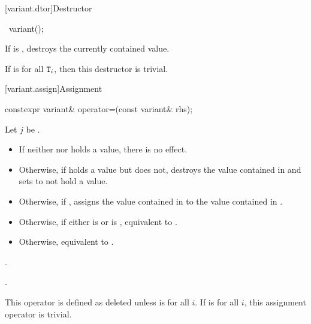 [variant.dtor]{Destructor}

%
\begin{itemdecl}
~variant();
\end{itemdecl}

\begin{itemdescr}
\pnum
\effects
If  is ,
destroys the currently contained value.

\pnum
\remarks
If  is  for all $\texttt{T}_i$,
then this destructor is trivial.
\end{itemdescr}

[variant.assign]{Assignment}

%
\begin{itemdecl}
constexpr variant& operator=(const variant& rhs);
\end{itemdecl}

\begin{itemdescr}
\pnum
Let $j$ be .

\pnum
\effects
\begin{itemize}
\item
If neither  nor  holds a value, there is no effect.
\item
Otherwise, if  holds a value but  does not, destroys the value
contained in  and sets  to not hold a value.
\item
Otherwise, if , assigns the value contained in 
to the value contained in .
\item
Otherwise, if either 
is  or
 is ,
equivalent to .
\item
Otherwise, equivalent to .
\end{itemize}

\pnum
\returns
{}.

\pnum
\ensures
{}.

\pnum
\remarks
This operator is defined as deleted unless
is  for all $i$.
If 
is  for all $i$, this assignment operator is trivial.
\end{itemdescr}

